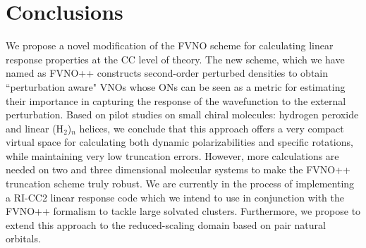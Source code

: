 \section{Conclusions}
We propose a novel modification of the FVNO scheme for calculating linear
response properties at the CC level of theory. The new scheme, which we have named
as FVNO++ constructs second-order perturbed densities to obtain ``perturbation
aware" VNOs whose ONs can be seen as a metric for estimating 
their importance in capturing the response of the wavefunction to the external 
perturbation. Based on pilot studies on small chiral molecules: hydrogen peroxide 
and linear (H$_2$)$_n$ helices, we conclude that this approach offers a very compact 
virtual space for calculating both dynamic polarizabilities and specific rotations,
while maintaining very low truncation errors. However, more calculations are 
needed on two and three dimensional molecular systems to make the FVNO++ truncation 
scheme truly robust. We are currently in the process of implementing a RI-CC2 linear 
response code\cite{Friese12} which we intend to use in conjunction with the FVNO++ formalism 
to tackle large solvated clusters. Furthermore, we propose to extend this approach 
to the reduced-scaling domain based on pair natural orbitals\cite{NeeseCCSD09,Neese09}.

